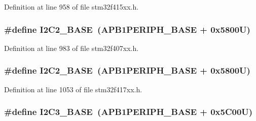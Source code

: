 Definition at line 958 of file stm32f415xx.\+h.

\subsubsection[{\texorpdfstring{I2\+C2\+\_\+\+B\+A\+SE}{I2C2_BASE}}]{\setlength{\rightskip}{0pt plus 5cm}\#define I2\+C2\+\_\+\+B\+A\+SE~({\bf A\+P\+B1\+P\+E\+R\+I\+P\+H\+\_\+\+B\+A\+SE} + 0x5800\+U)}\hypertarget{group___peripheral__registers__structures_ga04bda70f25c795fb79f163b633ad4a5d}{}\label{group___peripheral__registers__structures_ga04bda70f25c795fb79f163b633ad4a5d}


Definition at line 983 of file stm32f407xx.\+h.

\subsubsection[{\texorpdfstring{I2\+C2\+\_\+\+B\+A\+SE}{I2C2_BASE}}]{\setlength{\rightskip}{0pt plus 5cm}\#define I2\+C2\+\_\+\+B\+A\+SE~({\bf A\+P\+B1\+P\+E\+R\+I\+P\+H\+\_\+\+B\+A\+SE} + 0x5800\+U)}\hypertarget{group___peripheral__registers__structures_ga04bda70f25c795fb79f163b633ad4a5d}{}\label{group___peripheral__registers__structures_ga04bda70f25c795fb79f163b633ad4a5d}


Definition at line 1053 of file stm32f417xx.\+h.

\subsubsection[{\texorpdfstring{I2\+C3\+\_\+\+B\+A\+SE}{I2C3_BASE}}]{\setlength{\rightskip}{0pt plus 5cm}\#define I2\+C3\+\_\+\+B\+A\+SE~({\bf A\+P\+B1\+P\+E\+R\+I\+P\+H\+\_\+\+B\+A\+SE} + 0x5\+C00\+U)}\hypertarget{group___peripheral__registers__structures_ga4e8b9198748235a1729e1e8f8f24983b}{}\label{group___peripheral__registers__structures_ga4e8b9198748235a1729e1e8f8f24983b}


